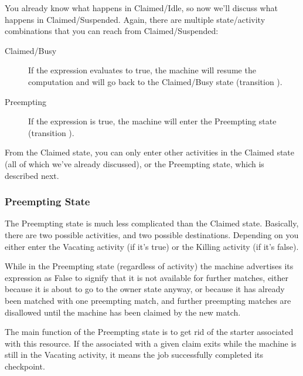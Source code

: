 You already know what happens in Claimed/Idle, so now we'll discuss
what happens in Claimed/Suspended.  Again, there are multiple
state/activity combinations that you can reach from Claimed/Suspended:

\begin{description}
  
\item[Claimed/Busy] If the  expression evaluates to
  true, the machine will resume the computation and will go back to the
  Claimed/Busy state (transition ).

\item[Preempting] If the  expression is true, the machine
  will enter the Preempting state (transition ).

\end{description}

From the Claimed state, you can only enter other activities in the
Claimed state (all of which we've already discussed), or the
Preempting state, which is described next.

\subsubsection{\label{sec:Preempting-State}Preempting State}

The Preempting state is much less complicated than the Claimed state.
Basically, there are two possible activities, and two possible
destinations.  Depending on  you either enter the
Vacating activity (if it's true) or the Killing activity (if it's
false).  

While in the Preempting state (regardless of activity) the machine
advertises its  expression as False to signify that
it is not available for further matches, either because it is about to go
to the owner state anyway, or because it has already been matched with
one preempting match, and further preempting matches are disallowed
until the machine has been claimed by the new match.

The main function of the Preempting state is to get rid of the starter
associated with this resource.  If the  associated
with a given claim exits while the machine is still in the Vacating
activity, it means the job successfully completed its checkpoint.

